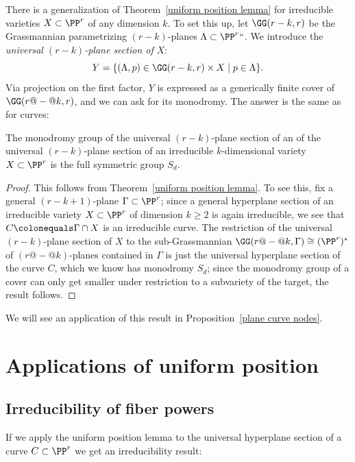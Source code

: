 There is
a generalization of Theorem~\ref{uniform position lemma}
for irreducible varieties $X \subset \PP^r$ of any dimension $k$. To set
this up, let $\GG(r-k,r)$ be the 
Grassmannian
%
parametrizing $(r-k)$-planes
$\Lambda \subset \PP^r` `$. We introduce the \emph{universal $(r-k)$-plane
section of} $X$:
$$
Y = \{ (\Lambda, p) \in \GG(r-k,r) \times X \mid p \in \Lambda \}.
$$
Via
projection on the first factor, $Y$ 
is expressed as a generically finite
cover of $\GG(r{@-@}k,r)$, and we can ask for its monodromy. The answer is
the same as for curves:


\begin{theorem}\label{higher dim uniform position lemma}
The monodromy group of the universal $(r-k)$-plane section of an
%
%
of the universal $(r-k)$-plane section of an
irreducible $k$-dimensional variety $X \subset \PP^r$ is the full
%
symmetric group
$S_d$.
\end{theorem}

\begin{proof}
This follows from Theorem~\ref{uniform position lemma}.
To see this,
fix a general $(r-k+1)$-plane $\Gamma \subset \PP^r$; since a
general hyperplane section of an irreducible variety $X \subset \PP^r$
of dimension $k \geq 2$ is again irreducible, we see that $C \colonequals
\Gamma \cap X$ is an irreducible curve. The restriction of the universal
$(r-k)$-plane section of $X$ to the sub-Grassmannian $\GG(r{@-@}k, \Gamma)
\cong (\PP^r)^*$ of $(r{@-@}k)$-planes contained in $\Gamma$ is just the
universal hyperplane section of the curve $C$, which we know has monodromy
$S_d$; since the monodromy group of a cover can only get smaller under
restriction to a subvariety of the target, the result follows.
\end{proof}

We will see an application of this result in 
Proposition~\ref{plane curve nodes}.

\section{Applications of uniform position}
\subsection*{Irreducibility of fiber powers}

If we apply the uniform position lemma to the universal hyperplane
section of a curve $C \subset \PP^r$ we get an irreducibility result:

